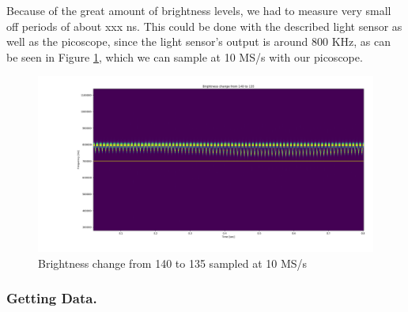 Because of the great amount of brightness levels, we had to measure very small off periods of about xxx ns. This could be done with the described light sensor as well as the picoscope, since the light sensor's output is around 800 KHz, as can be seen in Figure \ref{fig:plot-140-135}, which we can sample at 10 MS/s with our picoscope.

\begin{figure}[h]
	\centering
	\includegraphics[width=14cm]{img/Plot_140_135.png}
	\caption{Brightness change from 140 to 135 sampled at 10 MS/s}
	\label{fig:plot-140-135}
\end{figure}

\subsubsection{Getting Data.}
